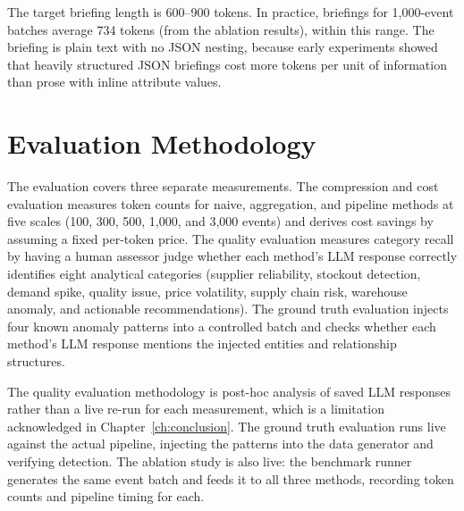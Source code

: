 The target briefing length is 600--900 tokens. In practice, briefings for 1,000-event
batches average 734 tokens (from the ablation results), within this range. The
briefing is plain text with no JSON nesting, because early experiments showed that heavily
structured JSON briefings cost more tokens per unit of information than prose with inline
attribute values.

\section{Evaluation Methodology}
\label{sec:evaluation}

The evaluation covers three separate measurements. The compression and cost evaluation
measures token counts for naive, aggregation, and pipeline methods at five scales
(100, 300, 500, 1,000, and 3,000 events) and derives cost savings by assuming a fixed
per-token price. The quality evaluation measures category recall by having a human
assessor judge whether each method's LLM response correctly identifies eight analytical
categories (supplier reliability, stockout detection, demand spike, quality issue,
price volatility, supply chain risk, warehouse anomaly, and actionable recommendations).
The ground truth evaluation injects four known anomaly patterns into a controlled batch
and checks whether each method's LLM response mentions the injected entities and
relationship structures.

The quality evaluation methodology is post-hoc analysis of saved LLM responses rather
than a live re-run for each measurement, which is a limitation acknowledged in
Chapter~\ref{ch:conclusion}. The ground truth evaluation runs live against the actual
pipeline, injecting the patterns into the data generator and verifying detection.
The ablation study is also live: the benchmark runner generates the same event batch
and feeds it to all three methods, recording token counts and pipeline timing for each.
